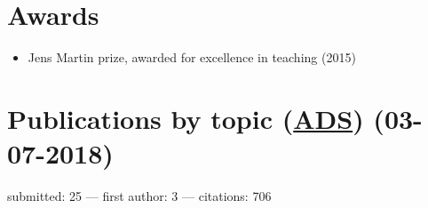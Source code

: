 \documentclass[12pt,letterpaper]{article}
\begin{document}
\section*{Awards}

	\begin{itemize}
    \item Jens Martin prize, awarded for excellence in teaching (2015)
	\end{itemize}

\newpage

\section*{Publications  by topic (\href{\adsurl}{ADS}) (03-07-2018)}
    submitted: 25 ---
    first author: 3 ---
    citations: 706


    \vspace{1em}
\end{document}
